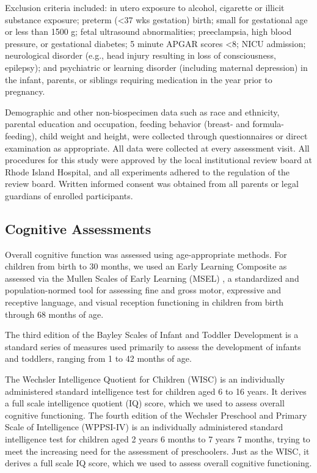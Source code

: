 \documentclass[fleqn,10pt]{wlscirep}
\begin{document}
Exclusion criteria included: in utero exposure to alcohol, cigarette or illicit substance exposure;
preterm (<37 wks gestation) birth; small for gestational age or less than 1500 g; fetal ultrasound abnormalities;
preeclampsia, high blood pressure, or gestational diabetes; 5 minute APGAR scores <8;
NICU admission; neurological disorder (e.g., head injury resulting in loss of consciousness, epilepsy);
and psychiatric or learning disorder (including maternal depression) in the infant, parents, or siblings requiring medication in the year prior to pregnancy.

Demographic and other non-biospecimen data such as race and ethnicity, parental education and occupation,
feeding behavior (breast- and formula-feeding), child weight and height,
were collected through questionnaires or direct examination as appropriate.
All data were collected at every assessment visit.
All procedures for this study were approved by the local institutional review board at Rhode Island Hospital,
and all experiments adhered to the regulation of the review board.
Written informed consent was obtained from all parents or legal guardians of enrolled participants.


\subsection*{Cognitive Assessments}

Overall cognitive function was assessed using age-appropriate methods.
For children from birth to 30 months, we used an Early Learning Composite
as assessed via the Mullen Scales of Early Learning (MSEL) \cite{Mullen1995-ty},
a standardized and population-normed tool for assessing fine and gross motor,
expressive and receptive language, and visual reception functioning in children from birth through 68 months of age.

The third edition of the Bayley Scales of Infant and Toddler Development \cite{Bayley2006-wm}
is a standard series of measures used primarily to assess the development of infants and toddlers,
ranging from 1 to 42 months of age.

The Wechsler Intelligence Quotient for Children (WISC) \cite{Wechsler2012-mi}
is an individually administered standard intelligence test for children aged 6 to 16 years.
It derives a full scale intelligence quotient (IQ) score, which we used to assess overall cognitive functioning.
The fourth edition of the Wechsler Preschool and Primary Scale of Intelligence (WPPSI-IV) \cite{Wechsler2012-mi}
is an individually administered standard intelligence test for children aged 2 years 6 months to 7 years 7 months,
trying to meet the increasing need for the assessment of preschoolers.
Just as the WISC, it derives a full scale IQ score, which we used to assess overall cognitive functioning.
\end{document}
